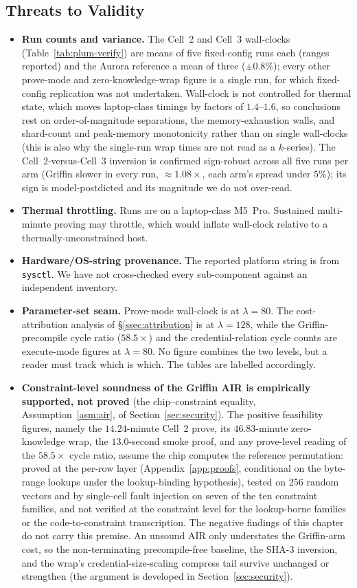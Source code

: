 \subsection{Threats to Validity}\label{ssec:threats}
\begin{itemize}
  \item \textbf{Run counts and variance.} The Cell~2 and Cell~3 wall-clocks (Table~\ref{tab:plum-verify}) are means of five fixed-config runs each (ranges reported) and the Aurora reference a mean of three ($\pm0.8\%$); every other prove-mode and zero-knowledge-wrap figure is a single run, for which fixed-config replication was not undertaken. Wall-clock is not controlled for thermal state, which moves laptop-class timings by factors of $1.4$--$1.6$, so conclusions rest on order-of-magnitude separations, the memory-exhaustion walls, and shard-count and peak-memory monotonicity rather than on single wall-clocks (this is also why the single-run wrap times are not read as a $k$-series). The Cell~2-versus-Cell~3 inversion is confirmed sign-robust across all five runs per arm (Griffin slower in every run, ${\approx}1.08\times$, each arm's spread under $5\%$); its sign is model-postdicted and its magnitude we do not over-read.
  \item \textbf{Thermal throttling.} Runs are on a laptop-class M5~Pro. Sustained multi-minute proving may throttle, which would inflate wall-clock relative to a thermally-unconstrained host.
  \item \textbf{Hardware/OS-string provenance.} The reported platform string is from \texttt{sysctl}. We have not cross-checked every sub-component against an independent inventory.
    \item \textbf{Parameter-set seam.} Prove-mode wall-clock is at $\lambda=80$. The cost-attribution analysis of \S\ref{ssec:attribution} is at $\lambda=128$, while the Griffin-precompile cycle ratio ($58.5\times$) and the credential-relation cycle counts are execute-mode figures at $\lambda=80$. No figure combines the two levels, but a reader must track which is which. The tables are labelled accordingly.
  \item \textbf{Constraint-level soundness of the Griffin AIR is empirically supported, not proved} (the chip--constraint equality, Assumption~\ref{asm:air}, of Section~\ref{sec:security}). The positive feasibility figures, namely the $14.24$-minute Cell~2 prove, its $46.83$-minute zero-knowledge wrap, the $13.0$-second smoke proof, and any prove-level reading of the $58.5\times$ cycle ratio, assume the chip computes the reference permutation: proved at the per-row layer (Appendix~\ref{app:proofs}, conditional on the byte-range lookups under the lookup-binding hypothesis), tested on $256$ random vectors and by single-cell fault injection on seven of the ten constraint families, and not verified at the constraint level for the lookup-borne families or the code-to-constraint transcription. The negative findings of this chapter do not carry this premise. An unsound AIR only understates the Griffin-arm cost, so the non-terminating precompile-free baseline, the SHA-3 inversion, and the wrap's credential-size-scaling compress tail survive unchanged or strengthen (the argument is developed in Section~\ref{sec:security}).

\end{itemize}
